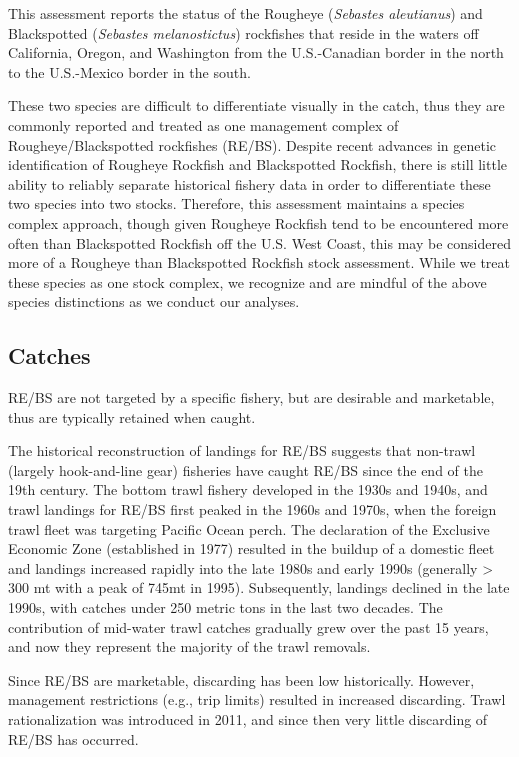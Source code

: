 \documentclass[
  english,
]{article}
\begin{document}
This assessment reports the status of the Rougheye (\emph{Sebastes
aleutianus}) and Blackspotted (\emph{Sebastes melanostictus}) rockfishes
that reside in the waters off California, Oregon, and Washington from
the U.S.-Canadian border in the north to the U.S.-Mexico border in the
south.

These two species are difficult to differentiate visually in the catch,
thus they are commonly reported and treated as one management complex of
Rougheye/Blackspotted rockfishes (RE/BS). Despite recent advances in
genetic identification of Rougheye Rockfish and Blackspotted Rockfish,
there is still little ability to reliably separate historical fishery
data in order to differentiate these two species into two stocks.
Therefore, this assessment maintains a species complex approach, though
given Rougheye Rockfish tend to be encountered more often than
Blackspotted Rockfish off the U.S. West Coast, this may be considered
more of a Rougheye than Blackspotted Rockfish stock assessment. While we
treat these species as one stock complex, we recognize and are mindful
of the above species distinctions as we conduct our analyses.

\subsection*{Catches}\label{catches}

RE/BS are not targeted by a specific fishery, but are desirable and
marketable, thus are typically retained when caught.

The historical reconstruction of landings for RE/BS suggests that
non-trawl (largely hook-and-line gear) fisheries have caught RE/BS since
the end of the 19th century. The bottom trawl fishery developed in the
1930s and 1940s, and trawl landings for RE/BS first peaked in the 1960s
and 1970s, when the foreign trawl fleet was targeting Pacific Ocean
perch. The declaration of the Exclusive Economic Zone (established in
1977) resulted in the buildup of a domestic fleet and landings increased
rapidly into the late 1980s and early 1990s (generally \textgreater{}
300 mt with a peak of 745mt in 1995). Subsequently, landings declined in
the late 1990s, with catches under 250 metric tons in the last two
decades. The contribution of mid-water trawl catches gradually grew over
the past 15 years, and now they represent the majority of the trawl
removals.

Since RE/BS are marketable, discarding has been low historically.
However, management restrictions (e.g., trip limits) resulted in
increased discarding. Trawl rationalization was introduced in 2011, and
since then very little discarding of RE/BS has occurred.
\end{document}
